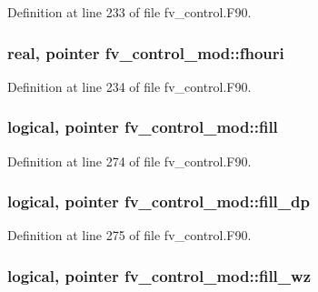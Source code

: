 Definition at line 233 of file fv\-\_\-control.\-F90.

\subsubsection[{fhouri}]{\setlength{\rightskip}{0pt plus 5cm}real, pointer fv\-\_\-control\-\_\-mod\-::fhouri\hspace{0.3cm}{\ttfamily [private]}}\label{classfv__control__mod_afc7eeadf515c9c1fc8b419404025f570}


Definition at line 234 of file fv\-\_\-control.\-F90.

\subsubsection[{fill}]{\setlength{\rightskip}{0pt plus 5cm}logical, pointer fv\-\_\-control\-\_\-mod\-::fill\hspace{0.3cm}{\ttfamily [private]}}\label{classfv__control__mod_a1c8e563dc793a7a9fdb217086386f370}


Definition at line 274 of file fv\-\_\-control.\-F90.

\subsubsection[{fill\-\_\-dp}]{\setlength{\rightskip}{0pt plus 5cm}logical, pointer fv\-\_\-control\-\_\-mod\-::fill\-\_\-dp\hspace{0.3cm}{\ttfamily [private]}}\label{classfv__control__mod_a0ef8552f4ff8792c17eeff1b212dad52}


Definition at line 275 of file fv\-\_\-control.\-F90.

\subsubsection[{fill\-\_\-wz}]{\setlength{\rightskip}{0pt plus 5cm}logical, pointer fv\-\_\-control\-\_\-mod\-::fill\-\_\-wz\hspace{0.3cm}{\ttfamily [private]}}\label{classfv__control__mod_a66f62df44cc9f1d8bae9a60868742934}


